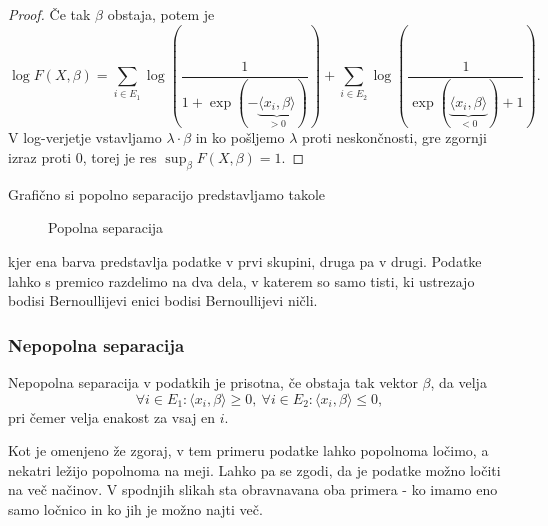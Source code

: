 \documentclass[12pt,a4paper]{amsart}
\theoremstyle{definition} %
\theoremstyle{plain} %
\begin{document}
\begin{proof}
    Če tak $\beta$ obstaja, potem je
    \[
    \log F(X,\beta) = \sum_{i\in E_{1}} \log\left(\frac{1}{1+\exp(-\underbrace{\langle x_{i},\beta \rangle}_{>0})}\right) + \sum_{i\in E_{2}}\log\left(\frac{1}{\exp(\underbrace{\langle x_{i},\beta \rangle}_{<0}) + 1}\right).
    \]
    V log-verjetje vstavljamo $\lambda \cdot \beta$ in ko pošljemo $\lambda$ proti neskončnosti, gre zgornji izraz proti 0, torej je res $\sup_{\beta} F(X,\beta) = 1.$
\end{proof}

Grafično si popolno separacijo predstavljamo takole
\begin{center}
    \begin{figure}[h!]
    \caption{Popolna separacija}
\end{figure}
\end{center}
kjer ena barva predstavlja podatke v prvi skupini, druga pa v drugi. Podatke lahko s premico razdelimo na dva dela, v katerem so samo tisti, ki ustrezajo bodisi Bernoullijevi enici
bodisi Bernoullijevi ničli.

\subsubsection{Nepopolna separacija}
Nepopolna separacija v podatkih je prisotna, če obstaja tak vektor $\beta$, da velja
\begin{equation}\label{nepopolnaSep}
    \forall i \in E_{1}: \langle x_{i},\beta \rangle \geq 0,~\forall i\in E_{2}: \langle x_{i},\beta \rangle \leq 0,
\end{equation}
pri čemer velja enakost za vsaj en $i$.

Kot je omenjeno že zgoraj, v tem primeru podatke lahko popolnoma ločimo, a nekatri ležijo popolnoma na meji. Lahko pa se zgodi, da je podatke možno ločiti na več načinov. V spodnjih
slikah sta obravnavana oba primera - ko imamo eno samo ločnico in ko jih je možno najti več.
\end{document}
